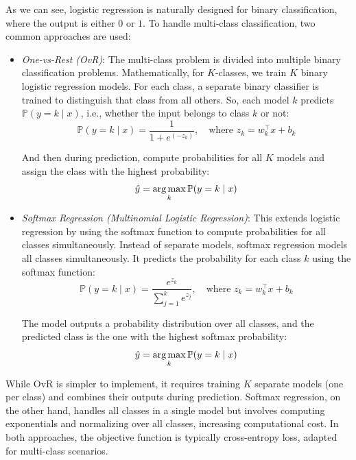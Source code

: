 As we can see, logistic regression is naturally designed for binary classification, where the output is either $0$ or $1$. To handle multi-class classification, two common approaches are used:
\begin{itemize}
    \item \emph{One-vs-Rest (OvR)}: The multi-class problem is divided into multiple binary classification problems. Mathematically, for $K$-classes, we train $K$ binary logistic regression models. For each class, a separate binary classifier is trained to distinguish that class from all others. So, each model $k$ predicts $\mathbb{P}(y=k\mid x)$, i.e., whether the input belongs to class $k$ or not:
    \begin{equation}
        \mathbb{P}(y=k\mid x) = \frac{1}{1 + e^{(-z_k)}},\quad \text{where }z_k = w_k^\top x+b_k
        \label{eqn:22}
    \end{equation}

    And then during prediction, compute probabilities for all $K$ models and assign the class with the highest probability:
    \begin{equation}
        \hat{y} = \operatorname*{arg\,max}_{k} \mathbb{P}(y=k\mid x)
        \label{eqn:23}
    \end{equation}
    
    \item \emph{Softmax Regression (Multinomial Logistic Regression)}: This extends logistic regression by using the softmax function to compute probabilities for all classes simultaneously. Instead of separate models, softmax regression models all classes simultaneously. It predicts the probability for each class $k$ using the softmax function:
    \begin{equation}
        \mathbb{P}(y=k\mid x) = \frac{e^{z_k}}{\sum_{j=1}^{k}e^{z_j}}, \quad \text{where }z_k = w_k^\top x + b_k
        \label{eqn:24}
    \end{equation}
    
    The model outputs a probability distribution over all classes, and the predicted class is the one with the highest softmax probability:
    \begin{equation}
        \hat{y} = \operatorname*{arg\,max}_{k} \mathbb{P}(y=k\mid x)
        \label{eqn:25}
    \end{equation}
\end{itemize}

While OvR is simpler to implement, it requires training $K$ separate models (one per class) and combines their outputs during prediction. Softmax regression, on the other hand, handles all classes in a single model but involves computing exponentials and normalizing over all classes, increasing computational cost. In both approaches, the objective function is typically cross-entropy loss, adapted for multi-class scenarios.


